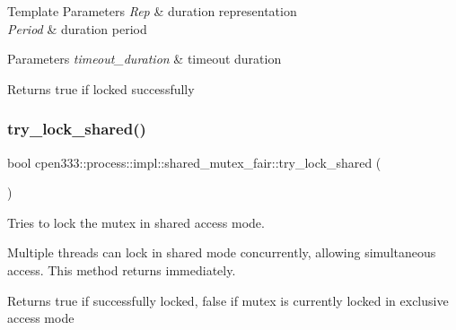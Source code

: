 \begin{DoxyTemplParams}{Template Parameters}
{\em Rep} & duration representation \\
\hline
{\em Period} & duration period \\
\hline
\end{DoxyTemplParams}

\begin{DoxyParams}{Parameters}
{\em timeout\+\_\+duration} & timeout duration \\
\hline
\end{DoxyParams}
\begin{DoxyReturn}{Returns}
true if locked successfully 
\end{DoxyReturn}
\mbox{\label{classcpen333_1_1process_1_1impl_1_1shared__mutex__fair_a1d1a77e135745777f6476fe0abcca078}} 
\subsubsection{\texorpdfstring{try\+\_\+lock\+\_\+shared()}{try\_lock\_shared()}}
{\footnotesize\ttfamily bool cpen333\+::process\+::impl\+::shared\+\_\+mutex\+\_\+fair\+::try\+\_\+lock\+\_\+shared (\begin{DoxyParamCaption}{ }\end{DoxyParamCaption})\hspace{0.3cm}{\ttfamily [inline]}}



Tries to lock the mutex in shared access mode. 

Multiple threads can lock in shared mode concurrently, allowing simultaneous access. This method returns immediately.

\begin{DoxyReturn}{Returns}
true if successfully locked, false if mutex is currently locked in exclusive access mode 
\end{DoxyReturn}
\mbox{\label{classcpen333_1_1process_1_1impl_1_1shared__mutex__fair_a0927a5897a261f5eb992eb442145fdf5}} 
